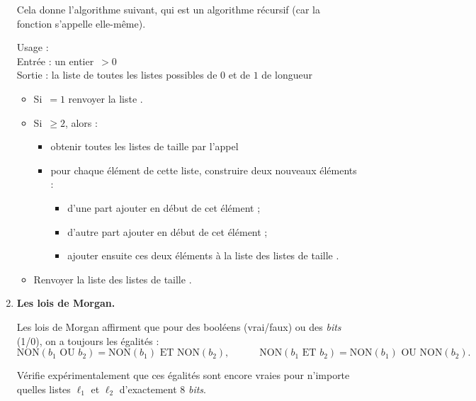 \documentclass[11pt,class=report,crop=false]{standalone}
\begin{document}
\begin{activite}
\begin{enumerate}
  Cela donne l'algorithme suivant, qui est un algorithme récursif (car la fonction s'appelle elle-même).
  \begin{algorithme}
  Usage : \\
  Entrée : un entier \,$>0$\\
  Sortie : la liste de toutes les listes possibles de $0$ et de $1$ de longueur 

  \begin{itemize}
    \item  Si \,$=1$ renvoyer la liste  \ci{[ [0], [1] ]}.     
    \item  Si \,$\ge2$, alors :
    \begin{itemize}
      \item obtenir toutes les listes de taille  par l'appel 
      \item pour chaque élément de cette liste, construire deux nouveaux éléments :
       \begin{itemize} 
         \item d'une part ajouter  en début de cet élément ;
         \item d'autre part ajouter  en début de cet élément ;
         \item ajouter ensuite ces deux éléments à la liste des listes de taille .
       \end{itemize}      
    \end{itemize}
    
    \item Renvoyer la liste des listes de taille .
  \end{itemize}     
 \end{algorithme}  
  
    \item \textbf{Les lois de Morgan.} 
    
    Les lois de Morgan affirment que pour des booléens (vrai/faux) ou des \emph{bits} (1/0), on a toujours les égalités :
    $$\text{NON}( b_1 \text{ OU } b_2 ) = 
    \text{NON}( b_1 )  \text{ ET } \text{NON}(b_2),
    \qquad \quad 
    \text{NON}( b_1 \text{ ET } b_2 ) = 
    \text{NON}( b_1 )  \text{ OU } \text{NON}(b_2).$$
    
    Vérifie expérimentalement que ces égalités sont encore vraies pour n'importe quelles listes $\ell_1$ et $\ell_2$ d'exactement $8$ \emph{bits}.
    
\end{enumerate}

\end{activite}
\end{document}

